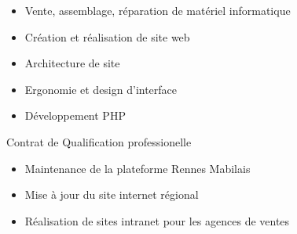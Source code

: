 \documentclass[10pt,a4paper]{altacv}
\begin{document}
\divider

\begin{itemize}
\item Vente, assemblage, réparation de matériel informatique
\end{itemize}

\divider

\begin{itemize}
\item Création et réalisation de site web
\item Architecture de site
\item Ergonomie et design d'interface
\item Développement PHP
\end{itemize}

\divider

Contrat de Qualification professionelle
\begin{itemize}
\item Maintenance de la plateforme Rennes Mabilais
\item Mise à jour du site internet régional
\item Réalisation de sites intranet pour les agences de ventes
\end{itemize}
\clearpage
\end{document}
